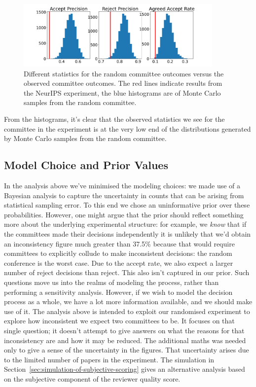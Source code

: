 \begin{figure}[htb]
\centering
\includegraphics[width=0.90\textwidth]{diagrams/neurips/random-committee-outcomes-vs-true.pdf}


\caption{Different statistics for the random committee outcomes versus the observed committee outcomes. The red lines indicate results from the NeurIPS experiment, the blue histograms are of Monte Carlo samples from the random committee.}
\label{random-committee-outcomes}
\end{figure}

From the histograms, it's clear that the observed statistics we see for the committee in the experiment is at the very low end of the distributions generated by Monte Carlo samples from the random committee.

\subsection{Model Choice and Prior
Values}\label{model-choice-and-prior-values}

In the analysis above we've minimised the modeling choices: we made use
of a Bayesian analysis to capture the uncertainty in counts that can be
arising from statistical sampling error. To this end we chose an
uninformative prior over these probabilities. However, one might argue
that the prior should reflect something more about the underlying
experimental structure: for example, we \emph{know} that if the
committees made their decisions independently it is unlikely that we'd
obtain an inconsistency figure much greater than 37.5\% because that
would require committees to explicitly collude to make inconsistent
decisions: the random conference is the worst case. Due to the accept
rate, we also expect a larger number of reject decisions than reject.
This also isn't captured in our prior. Such questions move us into the
realms of modeling the process, rather than performing a sensitivity
analysis. However, if we wish to model the decision process as a whole,
we have a lot more information available, and we should make use of it.
The analysis above is intended to exploit our randomised experiment to
explore how inconsistent we expect two committees to be. It focuses on
that single question; it doesn't attempt to give answers on what the
reasons for that inconsistency are and how it may be reduced. The
additional maths was needed only to give a sense of the uncertainty in
the figures. That uncertainty arises due to the limited number of papers
in the experiment. The simulation in Section~\ref{sec:simulation-of-subjective-scoring} gives an alternative analysis based on the subjective component of the reviewer quality score.

